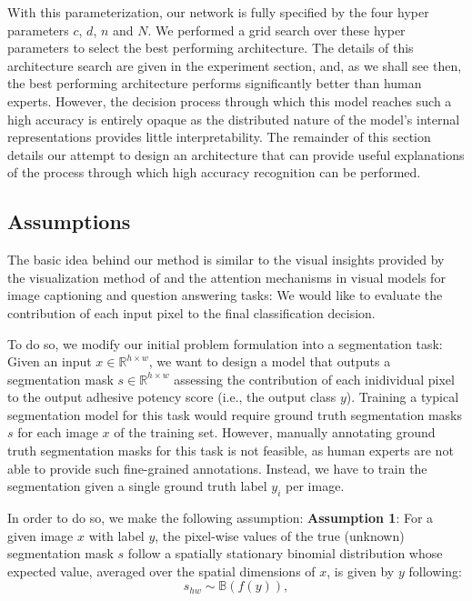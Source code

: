 \documentclass[10pt,twocolumn,letterpaper]{article}
\begin{document}
With this parameterization, our network is fully specified by the four hyper parameters $c$, $d$, $n$ and $N$.
We performed a grid search over these hyper parameters to select the best performing architecture.
The details of this architecture search are given in the experiment section,
and, as we shall see then, the best performing architecture performs significantly better than human experts.
However, the decision process through which this model reaches such a high accuracy is entirely opaque
as the distributed nature of the model's internal representations provides little interpretability.
The remainder of this section details our attempt to design an architecture that can provide 
useful explanations of the process through which high accuracy recognition can be performed.

\subsection{Assumptions}
The basic idea behind our method is similar to the visual insights provided by the
visualization method of \cite{} and the attention mechanisms in visual models 
for image captioning and question answering tasks:
We would like to evaluate the contribution of each input pixel to the final classification decision. 

To do so, we modify our initial problem formulation into a segmentation task:
Given an input $x \in \mathbb{R}^{h \times w}$, we want to design a model that outputs 
a segmentation mask $s \in \mathbb{R}^{h \times w}$ assessing the contribution of each inidividual pixel to the output adhesive potency score (i.e., the output class $y$).
Training a typical segmentation model for this task would require ground truth 
segmentation masks $s$ for each image $x$ of the training set.
However, manually annotating ground truth segmentation masks for this task is not feasible, 
as human experts are not able to provide such fine-grained annotations.
Instead, we have to train the segmentation given a single ground truth label $y_i$ per image.

In order to do so, we make the following assumption:
\textbf{Assumption 1}: 
For a given image $x$ with label $y$, 
the pixel-wise values of the true (unknown) segmentation mask $s$
follow a spatially stationary binomial distribution whose expected value, 
averaged over the spatial dimensions of $x$, is given by $y$ following:
$$
s_{hw} \sim \mathbb{B}(f(y)),
$$
\end{document}
